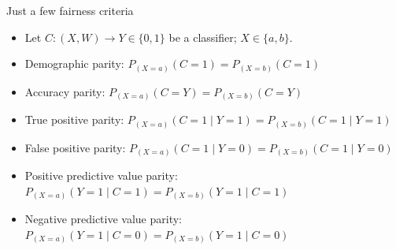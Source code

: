 \documentclass[12pt,t]{beamer}
\begin{document}

\begin{frame}[c]{Just a few fairness criteria}

\begin{center}
\begin{itemize}
  \itemsep8pt
  \item Let $C: (X, W) \to Y \in \{0, 1\}$ be a classifier; $X \in \{a, b\}$.
  \item Demographic parity: $P_{(X = a)}(C = 1) = P_{(X = b)}(C = 1)$
  \item Accuracy parity: $P_{(X = a)}(C = Y) = P_{(X = b)}(C = Y)$
  \item True positive parity: $P_{(X = a)}(C = 1 \mid Y = 1) = P_{(X = b)}(C =
    1 \mid Y = 1)$
  \item False positive parity: $P_{(X = a)}(C = 1 \mid Y = 0) = P_{(X = b)}(C =
    1 \mid Y = 0)$
  \item Positive predictive value parity: $P_{(X = a)}(Y = 1 \mid C = 1) =
    P_{(X = b)}(Y = 1 \mid C = 1)$
  \item Negative predictive value parity: $P_{(X = a)}(Y = 1 \mid C = 0) =
    P_{(X = b)}(Y = 1 \mid C = 0)$
\end{itemize}
\end{center}


\end{frame}

\end{document}
